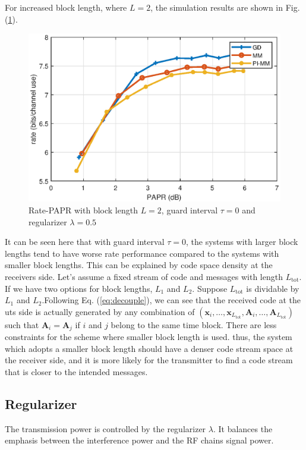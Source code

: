 \documentclass[12pt,draftclsnofoot,onecolumn,journal]{IEEEtran}
\begin{document}
For increased block length, where $L=2$, the simulation results are shown in Fig. (\ref{fig:paprL2}).
\begin{figure}[htbp]\flushleft
\includegraphics[width=6in]{L2n-3.eps} 
\caption{Rate-PAPR with block length $L=2$, guard interval $\tau=0$ and regularizer $\lambda=0.5$} \label{fig:paprL2}
\end{figure}

It can be seen here that with guard interval $\tau=0$, the systems with larger block lengths tend to have worse rate performance compared to the systems with smaller block lengths. This can be explained by code space density at the receivers side. Let's assume a fixed stream of code and messages with length $L_\mathrm{tot}$. If we have two options for block lengths, $L_1$ and $L_2$. Suppose $L_\mathrm{tot}$ is dividable by $L_1$ and $L_2$.Following Eq. (\ref{eq:decouple}), we can see that the received code at the \acp{ut} side is actually generated by any combination of $(\mathbf x_i, \dots, \mathbf x_{L_\mathrm{tot}}, \mathbf A_i, \dots, \mathbf A_{L_\mathrm{tot}})$ such that  $\mathbf A_i=\mathbf A_j$ if $i$ and $j$ belong to the same time block. There are less constraints for the scheme where smaller block length is used. thus, the system which adopts a smaller block length should have a denser code stream space at the receiver side, and it is more likely for the transmitter to find a code stream that is closer to the intended messages. 


\subsection {Regularizer}
The transmission power is controlled by the regularizer $\lambda$. It balances the emphasis between the interference power and the RF chains signal power. 
\end{document}
